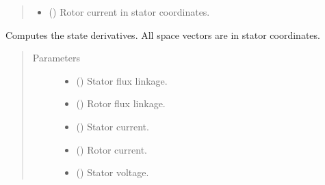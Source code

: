 \documentclass[letterpaper,10pt,english]{sphinxmanual}
\begin{document}
\begin{fulllineitems}
\begin{fulllineitems}
\begin{quote}
\begin{description}
\begin{itemize}
\item {} 
\sphinxAtStartPar
{} () \textendash{} Rotor current in stator coordinates.

\end{itemize}


\end{description}\end{quote}

\end{fulllineitems}


\begin{fulllineitems}
\label{\detokenize{model:model.im_drive.Motor.f}}
\pysigstartsignatures
{}
\pysigstopsignatures
\sphinxAtStartPar
Computes the state derivatives. All space vectors are in stator
coordinates.
\begin{quote}\begin{description}
\item[{Parameters}] \leavevmode\begin{itemize}
\item {} 
\sphinxAtStartPar
{} () \textendash{} Stator flux linkage.

\item {} 
\sphinxAtStartPar
{} () \textendash{} Rotor flux linkage.

\item {} 
\sphinxAtStartPar
{} () \textendash{} Stator current.

\item {} 
\sphinxAtStartPar
{} () \textendash{} Rotor current.

\item {} 
\sphinxAtStartPar
{} () \textendash{} Stator voltage.


\end{itemize}
\end{description}
\end{quote}
\end{fulllineitems}
\end{fulllineitems}
\end{document}
